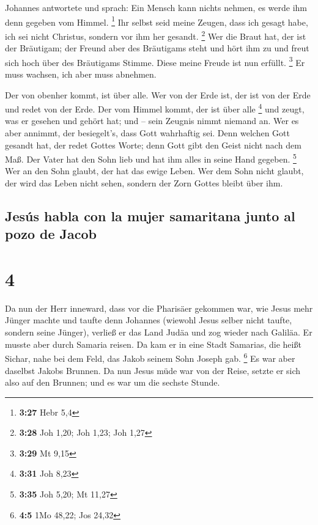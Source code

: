  Johannes antwortete und sprach: Ein Mensch kann nichts
nehmen, es werde ihm denn gegeben vom Himmel. \footnote{\textbf{3:27}
  Hebr 5,4}  Ihr selbst seid meine Zeugen, dass ich
gesagt habe, ich sei nicht Christus, sondern vor ihm her gesandt.
\footnote{\textbf{3:28} Joh 1,20; Joh 1,23; Joh 1,27} 
Wer die Braut hat, der ist der Bräutigam; der Freund aber des Bräutigams
steht und hört ihm zu und freut sich hoch über des Bräutigams Stimme.
Diese meine Freude ist nun erfüllt. \footnote{\textbf{3:29} Mt 9,15}
 Er muss wachsen, ich aber muss abnehmen.

 Der von obenher kommt, ist über alle. Wer von der Erde
ist, der ist von der Erde und redet von der Erde. Der vom Himmel kommt,
der ist über alle \footnote{\textbf{3:31} Joh 8,23}  und
zeugt, was er gesehen und gehört hat; und -- sein Zeugnis nimmt niemand
an.  Wer es aber annimmt, der besiegelt's, dass Gott
wahrhaftig sei.  Denn welchen Gott gesandt hat, der redet
Gottes Worte; denn Gott gibt den Geist nicht nach dem Maß.
 Der Vater hat den Sohn lieb und hat ihm alles in seine
Hand gegeben. \footnote{\textbf{3:35} Joh 5,20; Mt 11,27}
 Wer an den Sohn glaubt, der hat das ewige Leben. Wer dem
Sohn nicht glaubt, der wird das Leben nicht sehen, sondern der Zorn
Gottes bleibt über ihm.

\hypertarget{jesuxfas-habla-con-la-mujer-samaritana-junto-al-pozo-de-jacob}{%
\subsection{Jesús habla con la mujer samaritana junto al pozo de
Jacob}\label{jesuxfas-habla-con-la-mujer-samaritana-junto-al-pozo-de-jacob}}

\hypertarget{section-3}{%
\section{4}\label{section-3}}

 Da nun der Herr inneward, dass vor die Pharisäer gekommen
war, wie Jesus mehr Jünger machte und taufte denn Johannes
 (wiewohl Jesus selber nicht taufte, sondern seine
Jünger),  verließ er das Land Judäa und zog wieder nach
Galiläa.  Er musste aber durch Samaria reisen.
 Da kam er in eine Stadt Samarias, die heißt Sichar, nahe
bei dem Feld, das Jakob seinem Sohn Joseph gab. \footnote{\textbf{4:5}
  1Mo 48,22; Jos 24,32}  Es war aber daselbst Jakobs
Brunnen. Da nun Jesus müde war von der Reise, setzte er sich also auf
den Brunnen; und es war um die sechste Stunde.

